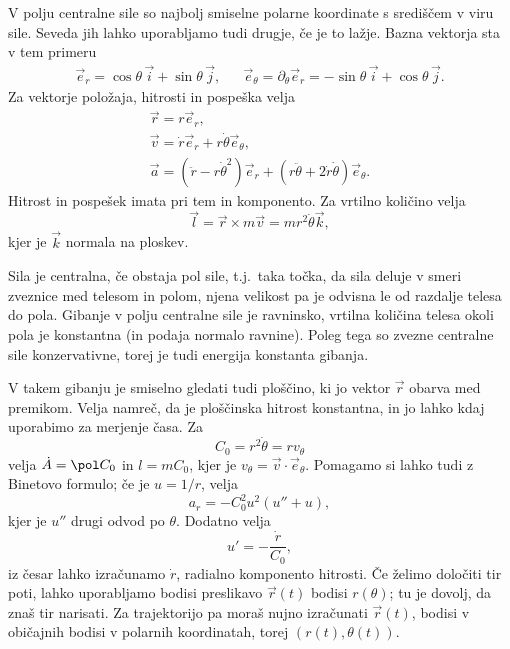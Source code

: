 

V polju centralne sile so najbolj smiselne polarne koordinate s središčem v viru
sile.
Seveda jih lahko uporabljamo tudi drugje, če je to lažje.
Bazna vektorja sta v tem primeru
\begin{align*}
  \vec{e}_r = \cos \theta\,\vec{i} + \sin \theta\,\vec{j},
  && \vec{e}_\theta = \partial_\theta \vec{e}_r
	 = - \sin \theta\,\vec{i} + \cos \theta\,\vec{j}.
\end{align*}
Za vektorje položaja, hitrosti in pospeška velja
\begin{gather*}
  \vec{r} = r \vec{e}_r, \\
  \vec{v} = \dot{r} \vec{e}_r + r \dot{\theta} \vec{e}_\theta, \\
  \vec{a} = (\ddot{r} - r \dot{\theta}^2) \vec{e}_r
  + (r \ddot{\theta} + 2 \dot{r} \dot{\theta}) \vec{e}_\theta.
\end{gather*}
Hitrost in pospešek imata pri tem  in  komponento.
Za vrtilno količino velja
\[
  \vec{l} = \vec{r} \times m \vec{v} = m r^2 \dot{\theta} \vec{k},
\]
kjer je $\vec{k}$ normala na ploskev.


Sila je centralna, če obstaja pol sile, t.j.\ taka točka, da sila deluje v smeri
zveznice med telesom in polom, njena velikost pa je odvisna le od razdalje
telesa do pola.
Gibanje v polju centralne sile je ravninsko, vrtilna količina telesa okoli pola
je konstantna (in podaja normalo ravnine).
Poleg tega so zvezne centralne sile konzervativne, torej je tudi energija
konstanta gibanja.

V takem gibanju je smiselno gledati tudi ploščino, ki jo vektor $\vec{r}$ obarva
med premikom.
Velja namreč, da je ploščinska hitrost konstantna, in jo lahko kdaj uporabimo za
merjenje časa.
Za 
\[
  C_0 = r^2 \dot{\theta} = r v_{\theta}
\]
velja $\dot{A} = \pol C_0$ in $l = m C_0$, kjer je $v_\theta = \vec{v} \cdot
\vec{e}_\theta$.
Pomagamo si lahko tudi z Binetovo formulo; če je $u = 1 / r$, velja
\[
  a_r = - C_0^2 u^2 (u'' + u),
\]
kjer je $u''$ drugi odvod po $\theta$.
Dodatno velja
\[
  u' = - \frac{\dot{r}}{C_0},
\]
iz česar lahko izračunamo $\dot{r}$, radialno komponento hitrosti.
Če želimo določiti tir poti, lahko uporabljamo bodisi preslikavo $\vec{r}(t)$
bodisi $r(\theta)$; tu je dovolj, da znaš tir narisati.
Za trajektorijo pa moraš nujno izračunati $\vec{r}(t)$, bodisi v običajnih
bodisi v polarnih koordinatah, torej $(r(t), \theta(t))$.

